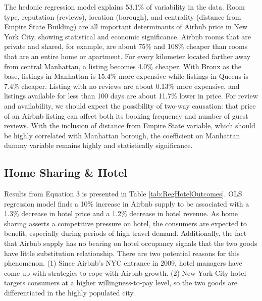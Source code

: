 \documentclass[12pt]{article}
\begin{document}
		 	The hedonic regression model explains 53.1\% of variability in the data. Room type, reputation (reviews), location (borough), and centrality (distance from Empire State Building) are all important determinants of Airbnb price in New York City, showing statistical and economic significance. Airbnb rooms that are private and shared, for example, are about 75\% and 108\% cheaper than rooms that are an entire home or apartment. For every kilometer located farther away from central Manhattan, a listing becomes 4.0\% cheaper. With Bronx as the base, listings in Manhattan is 15.4\% more expensive while listings in Queens is 7.4\% cheaper. Listing with no reviews are about 0.13\% more expensive, and listings available for less than 100 days are about 11.7\% lower in price. For review and availability, we should expect the possibility of two-way causation: that price of an Airbnb listing can affect both its booking frequency and number of guest reviews. With the inclusion of distance from Empire State variable, which should be highly correlated with Manhattan borough, the coefficient on Manhattan dummy variable remains highly and statistically significance.
			
		\subsection{Home Sharing \& Hotel}
			Results from Equation 3 is presented in Table \ref{tab:RegHotelOutcomes}. OLS regression model finds a 10\% increase in Airbnb supply to be associated with a 1.3\% decrease in hotel price and a 1.2\% decrease in hotel revenue. As home sharing asserts a competitive pressure on hotel, the consumers are expected to benefit, especially during periods of high travel demand. Additionally, the fact that Airbnb supply has no bearing on hotel occupancy signals that the two goods have little substitution relationship. There are two potential reasons for this phenomenon. (1) Since Airbnb's NYC entrance in 2009, hotel managers have come up with strategies to cope with Airbnb growth. (2) New York City hotel targets consumers at a higher willingness-to-pay level, so the two goods are differentiated in the highly populated city.
			
\end{document}
